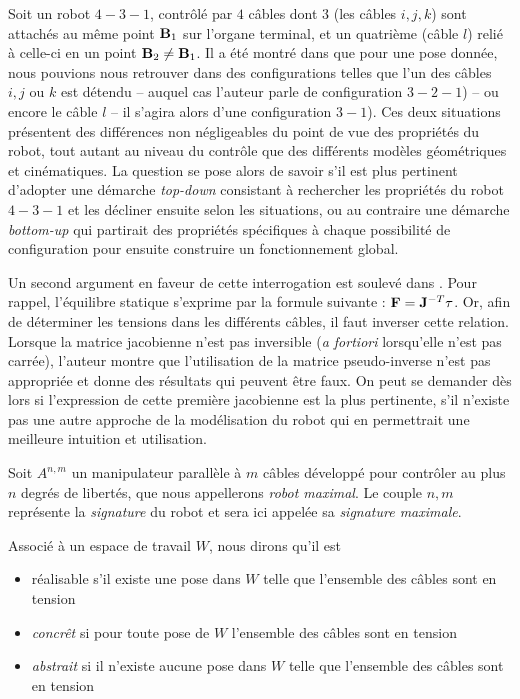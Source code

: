 Soit un robot $4-3-1$, contrôlé par $4$ câbles dont $3$ (les câbles $i, j, k$) 
sont attachés au même point ${\bf B}_1$ sur l'organe terminal, et un quatrième 
(câble $l$) relié à celle-ci en un point ${\bf B}_2 \neq {\bf B}_1$. Il a été 
montré dans \cite{merlet2013-431} que pour une pose donnée, nous pouvions nous 
retrouver dans des configurations telles que l'un des câbles $i, j$ ou $k$ est 
détendu -- auquel cas l'auteur parle de configuration $3-2-1$) -- ou encore le 
câble $l$ -- il s'agira alors d'une configuration $3-1$). Ces deux situations 
présentent des différences non négligeables du point de vue des propriétés du 
robot, tout autant au niveau du contrôle que des différents modèles géométriques 
et cinématiques. La question se pose alors de savoir s'il est plus pertinent 
d'adopter une démarche {\it top-down} consistant à rechercher les propriétés du 
robot $4-3-1$ et les décliner ensuite selon les situations, ou au contraire une 
démarche {\it bottom-up} qui partirait des propriétés spécifiques à chaque 
possibilité de configuration pour ensuite construire un fonctionnement global.

Un second argument en faveur de cette interrogation est soulevé 
dans \cite{merlet2012}. Pour rappel, l'équilibre statique s'exprime par la 
formule suivante : $\mathcal {\bf F} = {\bf J}^{-T} {\bf \tau}$. Or, afin de 
déterminer les tensions dans les différents câbles, il faut inverser cette 
relation. Lorsque la matrice jacobienne n'est pas inversible ({\it a fortiori} 
lorsqu'elle n'est pas carrée), l'auteur montre que l'utilisation de la matrice 
pseudo-inverse n'est pas appropriée et donne des résultats qui peuvent être 
faux. On peut se demander dès lors si l'expression de cette première jacobienne 
est la plus pertinente, s'il n'existe pas une autre approche de la modélisation 
du robot qui en permettrait une meilleure intuition et utilisation.

Soit $A^{n, m}$ un manipulateur parall\`ele \`a $m$ c\^ables d\'evelopp\'e pour 
contr\^oler au plus $n$ degr\'es de libert\'es, que nous appellerons {\it 
robot maximal}. Le couple ${n, m}$ repr\'esente la {\it signature} du robot et 
sera ici appel\'ee sa {\it signature maximale}.

Associ\'e à un espace de travail $W$, nous dirons qu'il est
\begin{itemize}
 \item {r\'ealisable} s'il existe une pose dans $W$ telle que l'ensemble des 
c\^ables sont en tension
  \item {\it concr\^et} si pour toute pose de $W$ l'ensemble des c\^ables sont 
en tension
  \item {\it abstrait} si il n'existe aucune pose dans $W$ telle que l'ensemble 
des c\^ables sont en tension
\end{itemize}


